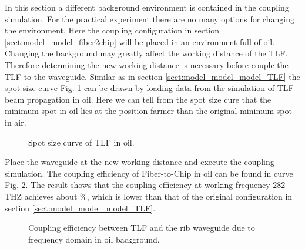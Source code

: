 In this section a different background environment is contained in the coupling simulation. For the practical experiment there are no many options for changing the environment. Here the coupling configuration in section \ref{sect:model_model_fiber2chip} will be placed in an environment full of oil. Changing the background may greatly affect the working distance of the  TLF. Therefore determining the new working distance is necessary before couple the TLF to the waveguide.  Similar as in section \ref{sect:model_model_model_TLF} the spot size curve Fig. \ref{fig:oil_spot_curve} can be drawn by loading data from the simulation of TLF beam propagation in oil. Here we can tell from the spot size cure that the minimum spot in oil lies at the position farmer than the original minimum spot in air.    
\begin{figure}[!ht]
\centering
\caption{Spot size curve of TLF in oil.}
\label{fig:oil_spot_curve}
\end{figure}
Place the waveguide at the new working distance and execute the coupling simulation. The coupling efficiency of Fiber-to-Chip in oil can be found in curve Fig. \ref{fig:oil_coupling_curve}. The result shows that the coupling efficiency at working frequency $282$THZ achieves about $\%$, which is lower than that of the original configuration in section \ref{sect:model_model_model_TLF}.
\begin{figure}[!ht]
\centering
\caption{Coupling efficiency between TLF and the rib waveguide due to frequency domain in oil background.}
\label{fig:oil_coupling_curve}
\end{figure}
